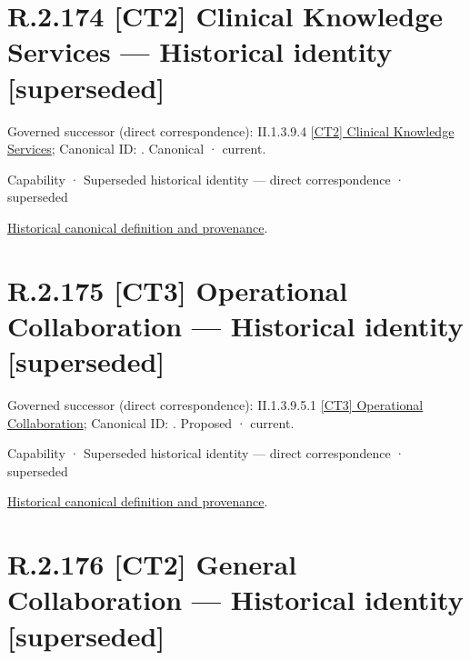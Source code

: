 \section*{R.2.174 [CT2] Clinical Knowledge Services — Historical identity [superseded]}
\label{navigation:R.2.174}

{\small Governed successor (direct correspondence): II.1.3.9.4 \hyperref[element:bbd2bd21859f40e39963bdbe7a851686]{[CT2] Clinical Knowledge Services}; Canonical ID: \texttt{}. Canonical · current.}\par
\label{element:5b8478b08c3f42c0a3480edb8f0b9ea7}
{\small Capability · Superseded historical identity — direct correspondence · superseded}\par
\href{../../../../../../../continuum/strategy/capability/5b8478b08c3f42c0a3480edb8f0b9ea7.md}{Historical canonical definition and provenance}.\par
\section*{R.2.175 [CT3] Operational Collaboration — Historical identity [superseded]}
\label{navigation:R.2.175}

{\small Governed successor (direct correspondence): II.1.3.9.5.1 \hyperref[element:631fdb8b47084008ac9b5de28b26972b]{[CT3] Operational Collaboration}; Canonical ID: \texttt{}. Proposed · current.}\par
\label{element:99e9d9763ec94140b7d7642f4b5966f6}
{\small Capability · Superseded historical identity — direct correspondence · superseded}\par
\href{../../../../../../../continuum/strategy/capability/99e9d9763ec94140b7d7642f4b5966f6.md}{Historical canonical definition and provenance}.\par
\section*{R.2.176 [CT2] General Collaboration — Historical identity [superseded]}
\label{navigation:R.2.176}

